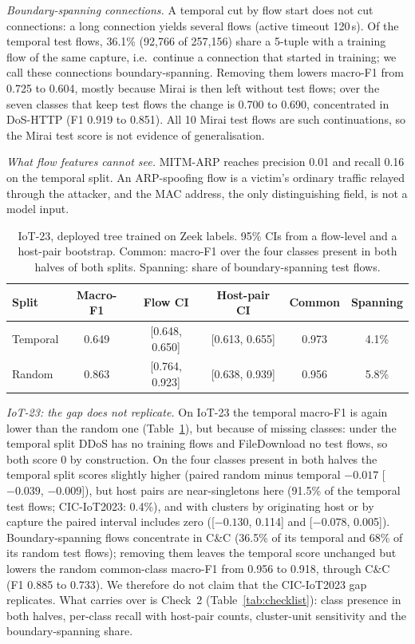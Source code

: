 \emph{Boundary-spanning connections.} A temporal cut by flow start does not cut connections: a long connection yields several flows (active timeout 120\,s). Of the temporal test flows, 36.1\% (92,766 of 257,156) share a 5-tuple with a training flow of the same capture, i.e.\ continue a connection that started in training; we call these connections boundary-spanning. Removing them lowers macro-F1 from 0.725 to 0.604, mostly because Mirai is then left without test flows; over the seven classes that keep test flows the change is 0.700 to 0.690, concentrated in DoS-HTTP (F1 0.919 to 0.851). All 10 Mirai test flows are such continuations, so the Mirai test score is not evidence of generalisation.

\emph{What flow features cannot see.} MITM-ARP reaches precision 0.01 and recall 0.16 on the temporal split. An ARP-spoofing flow is a victim's ordinary traffic relayed through the attacker, and the MAC address, the only distinguishing field, is not a model input.

\begin{table}[t]
\centering
\caption{IoT-23, deployed tree trained on Zeek labels. 95\% CIs from a flow-level and a host-pair bootstrap. Common: macro-F1 over the four classes present in both halves of both splits. Spanning: share of boundary-spanning test flows.}
\label{tab:iot23split}
\footnotesize
\setlength{\tabcolsep}{2.5pt}
\begin{tabular}{lccccc}
\hline
Split & Macro-F1 & Flow CI & Host-pair CI & Common & Spanning \\
\hline
Temporal & 0.649 & [0.648, 0.650] & [0.613, 0.655] & 0.973 & 4.1\% \\
Random   & 0.863 & [0.764, 0.923] & [0.638, 0.939] & 0.956 & 5.8\% \\
\hline
\end{tabular}
\end{table}

\emph{IoT-23: the gap does not replicate.} On IoT-23 the temporal macro-F1 is again lower than the random one (Table~\ref{tab:iot23split}), but because of missing classes: under the temporal split DDoS has no training flows and FileDownload no test flows, so both score 0 by construction. On the four classes present in both halves the temporal split scores slightly higher (paired random minus temporal $-0.017$ [$-0.039$, $-0.009$]), but host pairs are near-singletons here (91.5\% of the temporal test flows; CIC-IoT2023: 0.4\%), and with clusters by originating host or by capture the paired interval includes zero ([$-0.130$, 0.114] and [$-0.078$, 0.005]). Boundary-spanning flows concentrate in C\&C (36.5\% of its temporal and 68\% of its random test flows); removing them leaves the temporal score unchanged but lowers the random common-class macro-F1 from 0.956 to 0.918, through C\&C (F1 0.885 to 0.733). We therefore do not claim that the CIC-IoT2023 gap replicates. What carries over is Check~2 (Table~\ref{tab:checklist}): class presence in both halves, per-class recall with host-pair counts, cluster-unit sensitivity and the boundary-spanning share.
